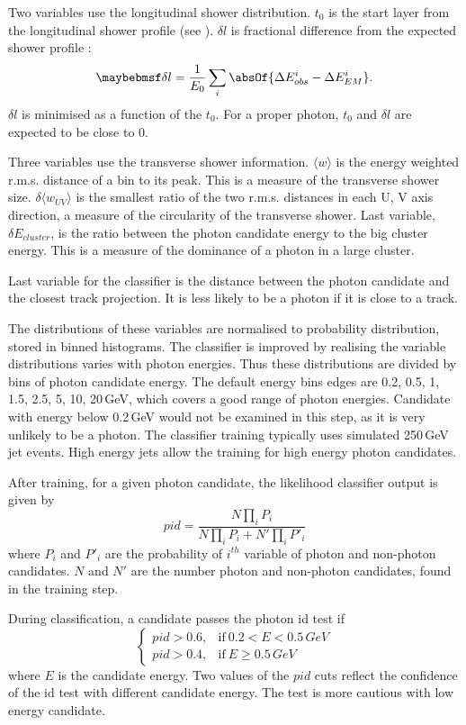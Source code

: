 Two variables use the longitudinal shower distribution. $t_0$ is the start layer from the longitudinal shower profile (see ). $\delta{l}$ is fractional difference from the expected shower profile \cite{Thomson:2009rp}:
\begin{equation}
\delta l = \frac{1}{E_0}\sum_{i}^{}\absOf{\Delta E_{obs}^i - \Delta E_{EM}^i }.
\end{equation}
$\delta l$ is minimised as a function of the $t_0$. For a proper photon, $t_0$  and $\delta l $ are expected to be close to 0.

Three variables use the transverse shower information. $\langle{w}\rangle$ is the energy weighted r.m.s. distance of a bin to its peak. This is a measure of the transverse shower size. $\delta{\langle{w_{UV}}\rangle}$ is the smallest ratio of the two r.m.s. distances in each U, V axis direction, a measure of the circularity of the transverse shower. Last variable, $\delta E_{cluster}$, is the  ratio between the photon candidate energy to the big cluster energy. This is a measure of the dominance of a photon in a large cluster.

Last variable for the classifier is the distance between the photon candidate and the closest track projection. It is less likely to be a photon if it is close to a track.

The distributions of these variables are normalised to probability distribution, stored in binned histograms. The classifier is improved by realising the variable distributions varies with photon energies. Thus these distributions are divided by bins of photon candidate energy. The default energy bins edges are 0.2, 0.5, 1, 1.5, 2.5, 5, 10, 20\,GeV, which covers a good range of photon energies. Candidate with energy below 0.2\,GeV would not be examined in this step, as it is very unlikely to be a photon. The classifier training typically uses simulated 250\,GeV jet events. High energy jets allow the training for high energy photon candidates.

After training, for a given photon candidate, the likelihood classifier output is given by
\begin{equation}
pid = \frac{N\prod_{i}{P_i}}{N\prod_{i}{P_i} + N'\prod_{i}{P'_i}}
\end{equation}
where $P_i$ and $P'_i$ are the probability of $i^{th}$ variable of photon and non-photon candidates. $N$ and $N'$ are the number photon and non-photon candidates, found in the training step.

During classification, a candidate passes the photon id test if
\begin{equation}
\begin{cases}
  pid > 0.6, & \text{if}\ 0.2 < E < 0.5\,GeV\\
  pid > 0.4, & \text{if}\ E \geqslant 0.5\,GeV
\end{cases}
\end{equation}
where $E$ is the candidate energy. Two values of the $pid$ cuts reflect the confidence of the id test with different candidate energy. The test is more cautious with low energy candidate.


